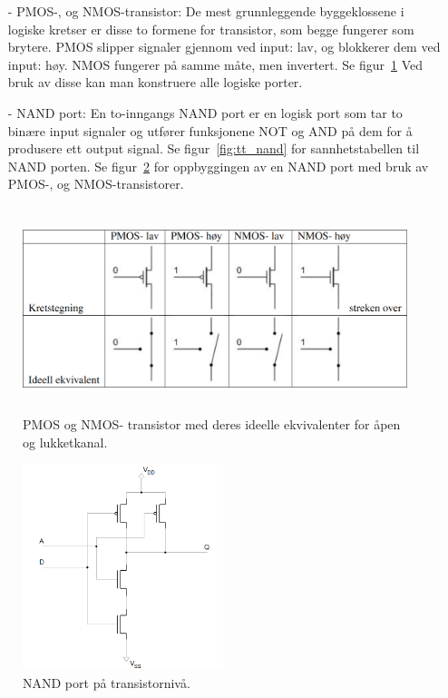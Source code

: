     \begin{itemize}
        \item[-] PMOS-, og NMOS-transistor: De mest grunnleggende byggeklossene i logiske kretser er disse to formene for transistor, som begge fungerer som brytere.
        PMOS slipper signaler gjennom ved input: lav, og blokkerer dem ved input: høy.
        NMOS fungerer på samme måte, men invertert.
        Se figur~\ref{fig:pnmos_transistors} Ved bruk av disse kan man konstruere alle logiske porter.
        \item[-] NAND port: En to-inngangs NAND port er en logisk port som tar to binære input signaler og utfører funksjonene NOT og AND på dem for å produsere ett output signal.
        Se figur~\ref{fig:tt_nand} for sannhetstabellen til NAND porten.
        Se figur~\ref{fig:NAND_transistorlevel} for oppbyggingen av en NAND port med bruk av PMOS-, og NMOS-transistorer.
    \end{itemize}

    \begin{figure}[!htb]
        \centering
        \includegraphics[height=6cm]{figurer/PNMOS.png}
        \caption{PMOS og NMOS- transistor med deres ideelle ekvivalenter for åpen og lukketkanal.}
        \label{fig:pnmos_transistors}
    \end{figure}

    \begin{figure}[!htb]
        \centering
        \includegraphics[height=6cm]{figurer/NAND_transistorlevel.png}
        \caption{NAND port på transistornivå.}
        \label{fig:NAND_transistorlevel}
    \end{figure}

